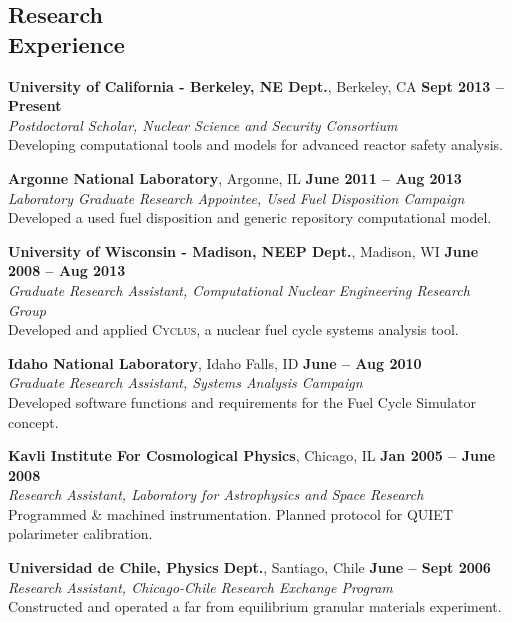 \documentclass[margin,line]{resume}
\newcommand{\Cyclus}{\textsc{Cyclus}\xspace}
\begin{document}
\begin{resume}
    \section{\mysidestyle Research\\Experience}
    \textbf{University of California - Berkeley, NE Dept.}, Berkeley, CA \hfill \textbf{Sept 2013 -- Present}\\
		\textsl{Postdoctoral Scholar, Nuclear Science and Security Consortium}\\ 
                Developing computational tools and models for advanced reactor safety analysis.  \vspace{-3mm}

    \textbf{Argonne National Laboratory}, Argonne, IL \hfill \textbf{June 2011 -- Aug 2013}\\
		\textsl{Laboratory Graduate Research Appointee, Used Fuel Disposition Campaign}\\ 
		Developed a used fuel disposition and generic repository computational model.  \vspace{-3mm}

    \textbf{University of Wisconsin - Madison, NEEP Dept.}, Madison, WI \hfill \textbf{June 2008 -- Aug 2013}\\
		\textsl{Graduate Research Assistant, Computational Nuclear Engineering Research Group}\\ 
		Developed and applied \Cyclus, a nuclear fuel cycle systems analysis tool.  \vspace{-3mm}

    \textbf{Idaho National Laboratory}, Idaho Falls, ID \hfill \textbf{June -- Aug 2010}\\
		\textsl{Graduate Research Assistant, Systems Analysis Campaign}\\ 
		Developed software functions and requirements for the Fuel Cycle Simulator concept.  \vspace{-3mm}

    \textbf{Kavli Institute For Cosmological Physics}, Chicago, IL \hfill \textbf{Jan 2005 -- June 2008}\\
                \textsl{Research Assistant, Laboratory for Astrophysics and Space Research}\\
                Programmed \& machined instrumentation. Planned protocol for QUIET polarimeter calibration.  \vspace{-3mm}

    \textbf{Universidad de Chile, Physics Dept.}, Santiago, Chile \hfill \textbf{June -- Sept 2006}\\
                \textsl{Research Assistant, Chicago-Chile Research Exchange Program}\\
                 Constructed and operated a far from equilibrium granular materials experiment.  \vspace{-3mm}


\end{resume}
\end{document}
